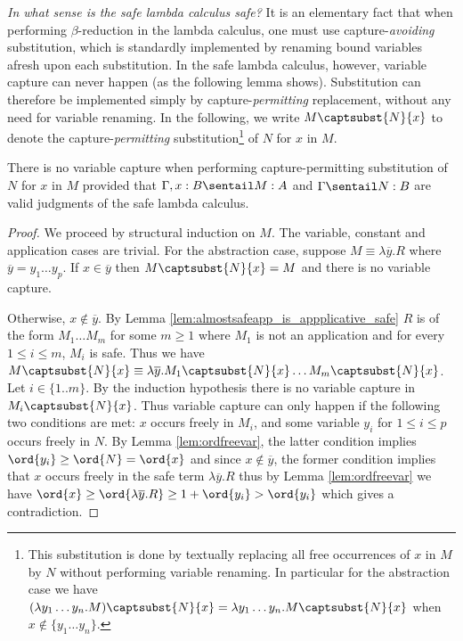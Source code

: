 \emph{In what sense is the safe lambda calculus safe?} It is an
elementary fact that when performing $\beta$-reduction in the lambda
calculus, one must use capture-\emph{avoiding} substitution, which
is standardly implemented by renaming bound variables afresh upon
each substitution. In the safe lambda calculus, however, variable
capture can never happen (as the following lemma shows).
Substitution can therefore be implemented simply by
capture-\emph{permitting} replacement, without any need for variable
renaming. In the following, we write $M\captsubst{N}{x}$ to denote
the capture-\emph{permitting} substitution\footnote{This
substitution is done by textually replacing all free occurrences of
$x$ in $M$ by $N$ without performing variable renaming.  In
particular for the abstraction
  case we have
$(\lambda y_1\ldots y_n . M)\captsubst{N}{x} = \lambda y_1\ldots y_n . M\captsubst{N}{x}$ when $x\not\in
  \{ y_1\ldots y_n \}$.}
of $N$ for $x$ in $M$.

\begin{lemma}\label{lem:nvc}
\label{lem:nocapture} There is no variable capture when performing
capture-permitting substitution of $N$ for $x$ in $M$ provided that
$\Gamma, x:B \sentail M : A$ and $\Gamma \sentail  N : B$ are valid
judgments of the safe lambda calculus.
\end{lemma}

\begin{proof}
  We proceed by structural induction on $M$. The variable, constant and
  application cases are trivial. For the abstraction case, suppose $M \equiv \lambda \overline{y}. R$ where $\overline{y} = y_1 \ldots y_p$. If $x \in \overline{y}$ then $M \captsubst{N}{x} = M$ and there is no variable capture.

 Otherwise, $x \not\in \overline{y}$. By Lemma \ref{lem:almostsafeapp_is_appplicative_safe} $R$ is of the
  form $M_1 \ldots M_m$ for some $m\geq 1$ where $M_1$ is not an application and for every $1 \leq i\leq m$, $M_i$ is safe.
 Thus we have $M \captsubst{N}{x} \equiv \lambda \overline{y} . M_1 \captsubst{N}{x} \ldots M_m \captsubst{N}{x}$.  Let $i\in\{1..m\}$. By the induction hypothesis there is no variable capture in $M_i \captsubst{N}{x}$.  Thus variable capture can only happen if the following two conditions are met: $x$ occurs freely in $M_i$, and some variable $y_i$ for $1 \leq i \leq p$ occurs freely in $N$. By Lemma \ref{lem:ordfreevar}, the latter condition implies $\ord{y_i} \geq \ord{N} = \ord{x}$ and  since $x \not \in \overline{y}$, the former condition implies that $x$ occurs freely in the safe term $\lambda \overline{y}. R$
  thus by Lemma \ref{lem:ordfreevar} we have $ \ord{x} \geq
  \ord{\lambda \overline{y} . R} \geq 1+ \ord{y_i} > \ord{y_i}$ which  gives a contradiction.
\end{proof}

